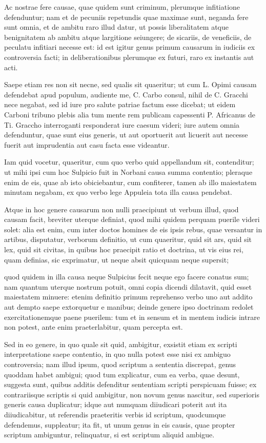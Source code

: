  Ac nostrae fere causae, quae quidem sunt criminum, plerumque infitiatione defenduntur; nam et de pecuniis repetundis quae maximae sunt, neganda fere sunt omnia, et de ambitu raro illud datur, ut possis liberalitatem atque benignitatem ab ambitu atque largitione seiungere; de sicariis, de veneficiis, de peculatu infitiari necesse est: id est igitur genus primum causarum in iudiciis ex controversia facti; in deliberationibus plerumque ex futuri, raro ex instantis aut acti.

 Saepe etiam res non sit necne, sed qualis sit quaeritur; ut cum L. Opimi causam defendebat apud populum, audiente me, C. Carbo consul, nihil de C. Gracchi nece negabat, sed id iure pro salute patriae factum esse dicebat; ut eidem Carboni tribuno plebis alia tum mente rem publicam capessenti P. Africanus de Ti. Graccho interroganti responderat iure caesum videri; iure autem omnia defenduntur, quae sunt eius generis, ut aut oportuerit aut licuerit aut necesse fuerit aut imprudentia aut casu facta esse videantur.

 Iam quid vocetur, quaeritur, cum quo verbo quid appellandum sit, contenditur; ut mihi ipsi cum hoc Sulpicio fuit in Norbani causa summa contentio; pleraque enim de eis, quae ab isto obiciebantur, cum confiterer, tamen ab illo maiestatem minutam negabam, ex quo verbo lege Appuleia tota illa causa pendebat.

 Atque in hoc genere causarum non nulli praecipiunt ut verbum illud, quod causam facit, breviter uterque definiat, quod mihi quidem perquam puerile videri solet: alia est enim, cum inter doctos homines de eis ipsis rebus, quae versantur in artibus, disputatur, verborum definitio, ut cum quaeritur, quid sit ars, quid sit lex, quid sit civitas, in quibus hoc praecipit ratio et doctrina, ut vis eius rei, quam definias, sic exprimatur, ut neque absit quicquam neque supersit;

 quod quidem in illa causa neque Sulpicius fecit neque ego facere conatus sum; nam quantum uterque nostrum potuit, omni copia dicendi dilatavit, quid esset maiestatem minuere: etenim definitio primum reprehenso verbo uno aut addito aut dempto saepe extorquetur e manibus; deinde genere ipso doctrinam redolet exercitationemque paene puerilem: tum et in sensum et in mentem iudicis intrare non potest, ante enim praeterlabitur, quam percepta est.

 Sed in eo genere, in quo quale sit quid, ambigitur, exsistit etiam ex scripti interpretatione saepe contentio, in quo nulla potest esse nisi ex ambiguo controversia; nam illud ipsum, quod scriptum a sententia discrepat, genus quoddam habet ambigui; quod tum explicatur, cum ea verba, quae desunt, suggesta sunt, quibus additis defenditur sententiam scripti perspicuam fuisse; ex contrariisque scriptis si quid ambigitur, non novum genus nascitur, sed superioris generis causa duplicatur; idque aut numquam diiudicari poterit aut ita diiudicabitur, ut referendis praeteritis verbis id scriptum, quodcumque defendemus, suppleatur; ita fit, ut unum genus in eis causis, quae propter scriptum ambiguntur, relinquatur, si est scriptum aliquid ambigue.

